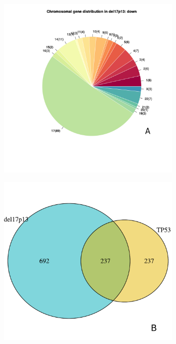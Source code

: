 \begin{figure}
	\centering
	\begin{subfigure}[t]{0.8\columnwidth}
		\includegraphics[width=\columnwidth]{./Figures/chromosom17_dist_down.pdf}
		\subcaption*{}
		\label{fig:chromosom17_dist_down}
	\end{subfigure}
	\quad
	\begin{subfigure}[t]{0.6\columnwidth}
		\includegraphics[width=\columnwidth]{./Figures/vennDel17TP53.pdf}

\end{subfigure}
\end{figure}
